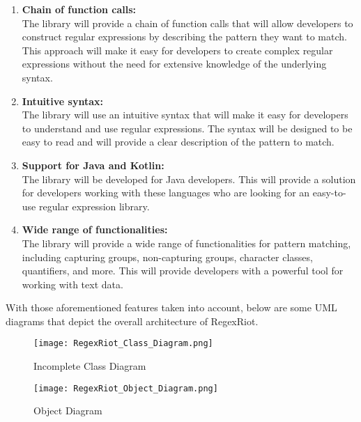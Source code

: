 \documentclass[conference]{IEEEtran}
\begin{document}
\begin{enumerate}
    \item \textbf{Chain of function calls:}\\
          The library will provide a chain of function calls that will allow developers
          to construct regular expressions by describing the pattern they want to match.
          This approach will make it easy for developers to create complex regular expressions
          without the need for extensive knowledge of the underlying syntax.

    \item \textbf{Intuitive syntax:}\\
          The library will use an intuitive syntax that will make it easy for developers
          to understand and use regular expressions. The syntax will be designed to be easy
          to read and will provide a clear description of the pattern to match.

    \item \textbf{Support for Java and Kotlin:}\\
          The library will be developed for Java developers.
          This will provide a solution for developers working with these languages who are
          looking for an easy-to-use regular expression library.

          \vfill\eject

    \item \textbf{Wide range of functionalities:}\\
          The library will provide a wide range of functionalities for pattern matching,
          including capturing groups, non-capturing groups, character classes, quantifiers,
          and more. This will provide developers with a powerful tool for working with text data.
\end{enumerate}

With those aforementioned features taken into account,
below are some UML diagrams that depict the overall architecture of RegexRiot.

\begin{figure}[htbp]
    \centering
    \texttt{[image: RegexRiot\_Class\_Diagram.png]}
    \caption{Incomplete Class Diagram}
    \label{fig:classdiagram}
\end{figure}

\begin{figure}[htbp]
    \centering
    \texttt{[image: RegexRiot\_Object\_Diagram.png]}
    \caption{Object Diagram}
    \label{fig:objdiagram}
\end{figure}
\end{document}
